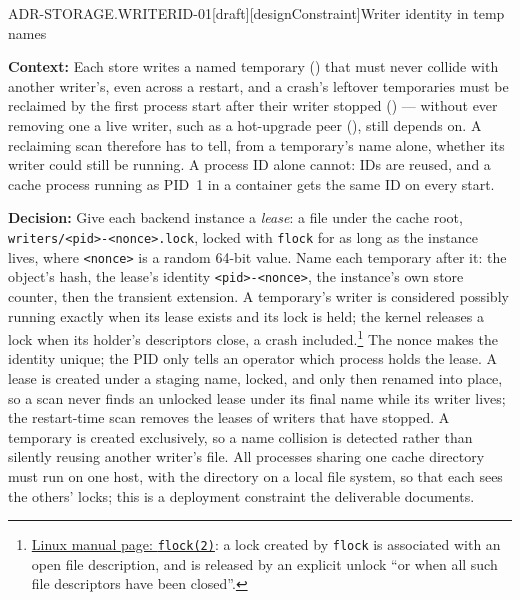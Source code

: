 \begin{requirement}{ADR-STORAGE.WRITERID-01}[draft][designConstraint]{Writer identity in temp names}


  \textbf{Context:} Each store writes a named temporary
  () that must never collide with
  another writer's, even across a restart, and a crash's leftover
  temporaries must be reclaimed by the first process start after their writer
  stopped () --- without ever removing
  one a live writer, such as a hot-upgrade peer
  (), still depends on. A reclaiming scan
  therefore has to tell, from a temporary's name alone, whether its writer
  could still be running. A process ID alone cannot: IDs are reused, and a
  cache process running as PID~1 in a container gets the same ID on every
  start.

  \textbf{Decision:} Give each backend instance a \emph{lease}: a file under
  the cache root, \texttt{writers/<pid>-<nonce>.lock}, locked with
  \texttt{flock} for as long as the instance lives, where \texttt{<nonce>} is
  a random 64-bit value. Name each temporary after it: the object's hash, the
  lease's identity \texttt{<pid>-<nonce>}, the instance's own store counter,
  then the transient extension. A temporary's writer is considered possibly running
  exactly when its lease exists and its lock is held; the kernel releases a
  lock when its holder's descriptors close, a crash
  included.\footnote{\href{https://man7.org/linux/man-pages/man2/flock.2.html}{Linux
  manual page: \texttt{flock(2)}}: a lock created by \texttt{flock} is
  associated with an open file description, and is released by an explicit
  unlock ``or when all such file descriptors have been closed''.} The nonce
  makes the identity unique; the PID only tells an operator which process
  holds the lease. A lease is created under a staging name, locked, and only
  then renamed into place, so a scan never finds an unlocked lease under its
  final name while its writer lives; the restart-time scan removes the
  leases of writers that have stopped. A temporary is created exclusively,
  so a name collision is detected rather than silently reusing another
  writer's file. All processes sharing one cache directory must run on one
  host, with the directory on a local file system, so that each sees the
  others' locks; this is a deployment constraint the deliverable documents.


\end{requirement}
